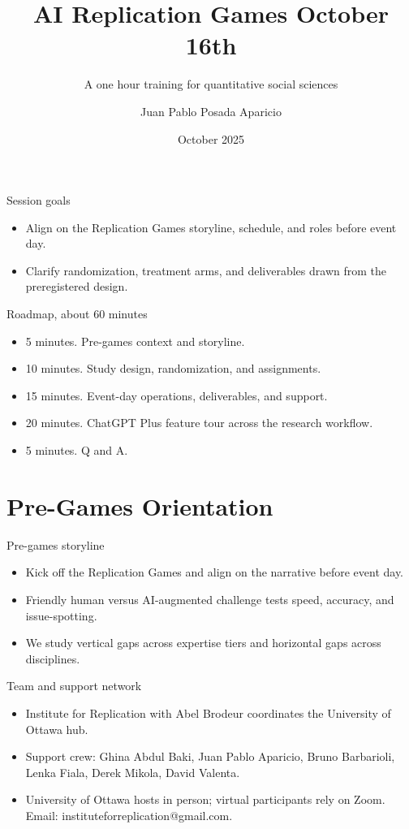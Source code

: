 \documentclass[aspectratio=169,professionalfonts]{beamer}
\title{AI Replication Games October 16th}
\subtitle{A one hour training for quantitative social sciences}
\author{Juan Pablo Posada Aparicio}
\institute{Institute for Replication, University of Ottawa}
\date{October 2025}
\begin{document}
\begin{frame}
  \titlepage
\end{frame}

\begin{frame}{Session goals}
  \begin{itemize}
    \item Align on the Replication Games storyline, schedule, and roles before event day.
    \item Clarify randomization, treatment arms, and deliverables drawn from the preregistered design.
  \end{itemize}
\end{frame}

\begin{frame}{Roadmap, about 60 minutes}
  \begin{itemize}
    \item 5 minutes. Pre-games context and storyline.
    \item 10 minutes. Study design, randomization, and assignments.
    \item 15 minutes. Event-day operations, deliverables, and support.
    \item 20 minutes. ChatGPT Plus feature tour across the research workflow.
    \item 5 minutes. Q and A.

  \end{itemize}
\end{frame}

\section{Pre-Games Orientation}

\begin{frame}{Pre-games storyline}
  \begin{itemize}
    \item Kick off the Replication Games and align on the narrative before event day.
    \item Friendly human versus AI-augmented challenge tests speed, accuracy, and issue-spotting.
    \item We study vertical gaps across expertise tiers and horizontal gaps across disciplines.
  \end{itemize}
\end{frame}

\begin{frame}{Team and support network}
  \begin{itemize}
    \item Institute for Replication with Abel Brodeur coordinates the University of Ottawa hub.
    \item Support crew: Ghina Abdul Baki, Juan Pablo Aparicio, Bruno Barbarioli, Lenka Fiala, Derek Mikola, David Valenta.
    \item University of Ottawa hosts in person; virtual participants rely on Zoom. Email: instituteforreplication@gmail.com.
  \end{itemize}
\end{frame}
\end{document}
